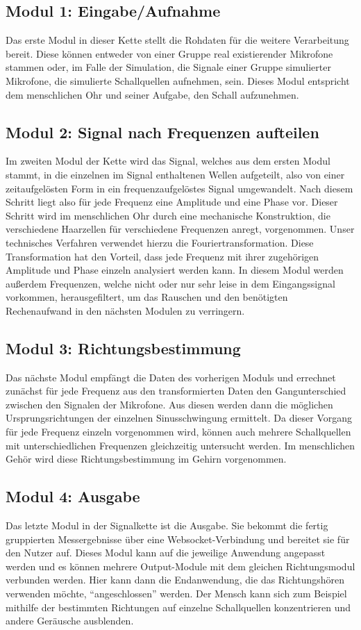 \subsection{Modul 1: Eingabe/Aufnahme}
Das erste Modul in dieser Kette stellt die Rohdaten für die weitere Verarbeitung bereit. Diese  können entweder von einer Gruppe real existierender Mikrofone stammen oder, im Falle der Simulation, die Signale einer Gruppe simulierter Mikrofone, die simulierte Schallquellen aufnehmen, sein. Dieses Modul entspricht dem menschlichen Ohr und seiner Aufgabe, den Schall aufzunehmen. 

\subsection{Modul 2: Signal nach Frequenzen aufteilen}
Im zweiten Modul der Kette wird das Signal, welches aus dem ersten Modul stammt, in die einzelnen im Signal enthaltenen Wellen aufgeteilt, also von einer zeitaufgelösten Form in ein frequenzaufgelöstes Signal umgewandelt. Nach diesem Schritt liegt also für jede Frequenz eine Amplitude und eine Phase vor. Dieser Schritt wird im menschlichen Ohr durch eine mechanische Konstruktion, die verschiedene Haarzellen für verschiedene Frequenzen anregt, vorgenommen. Unser technisches Verfahren verwendet hierzu die Fouriertransformation. Diese Transformation hat den Vorteil, dass jede Frequenz mit ihrer zugehörigen Amplitude und Phase einzeln analysiert werden kann. 
In diesem Modul werden außerdem Frequenzen, welche nicht oder nur sehr leise in dem Eingangssignal vorkommen, herausgefiltert, um das Rauschen und den benötigten Rechenaufwand in den nächsten Modulen zu verringern.

\subsection{Modul 3: Richtungsbestimmung}
Das nächste Modul empfängt die Daten des vorherigen Moduls und errechnet zunächst für jede Frequenz aus den transformierten Daten den Gangunterschied zwischen den Signalen der Mikrofone. Aus diesen werden dann die möglichen Ursprungsrichtungen der einzelnen Sinusschwingung ermittelt. Da dieser Vorgang für jede Frequenz einzeln vorgenommen wird, können auch mehrere Schallquellen mit unterschiedlichen Frequenzen gleichzeitig untersucht werden. Im menschlichen Gehör wird diese Richtungsbestimmung im Gehirn vorgenommen.

\subsection{Modul 4: Ausgabe}
Das letzte Modul in der Signalkette ist die Ausgabe. Sie bekommt die fertig gruppierten Messergebnisse über eine Websocket-Verbindung und bereitet sie für den Nutzer auf. Dieses Modul kann auf die jeweilige Anwendung angepasst werden und es können mehrere Output-Module mit dem gleichen Richtungsmodul verbunden werden. Hier kann dann die Endanwendung, die das Richtungshören verwenden möchte, ``angeschlossen'' werden. Der Mensch kann sich zum Beispiel mithilfe der bestimmten Richtungen auf einzelne Schallquellen konzentrieren und andere Geräusche ausblenden.